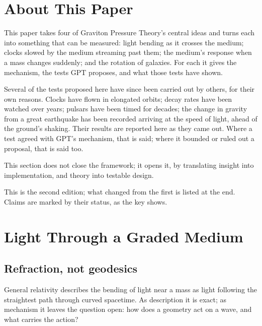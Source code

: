 \newcommand{\gptpart}{10}
\newcommand{\gpttitle}{Practical Exploration of Advanced Concepts}
\newcommand{\gptsubtitle}{Translating Graviton Dynamics into Testable and Applied Realities}
\newcommand{\gptdate}{November 2026}

\graphicspath{{figs/}}

\gptitle

\section*{About This Paper}

This paper takes four of Graviton Pressure Theory's central ideas and turns each into something that can be measured: light bending as it crosses the medium; clocks slowed by the medium streaming past them; the medium's response when a mass changes suddenly; and the rotation of galaxies. For each it gives the mechanism, the tests GPT proposes, and what those tests have shown.

Several of the tests proposed here have since been carried out by others, for their own reasons. Clocks have flown in elongated orbits; decay rates have been watched over years; pulsars have been timed for decades; the change in gravity from a great earthquake has been recorded arriving at the speed of light, ahead of the ground's shaking. Their results are reported here as they came out. Where a test agreed with GPT's mechanism, that is said; where it bounded or ruled out a proposal, that is said too.

This section does not close the framework; it opens it, by translating insight into implementation, and theory into testable design.

This is the second edition; what changed from the first is listed at the end. Claims are marked by their status, as the key shows.

\statuskey

\section{Light Through a Graded Medium}

\subsection{Refraction, not geodesics}

General relativity describes the bending of light near a mass as light following the straightest path through curved spacetime. As description it is exact; as mechanism it leaves the question open: how does a geometry act on a wave, and what carries the action?

